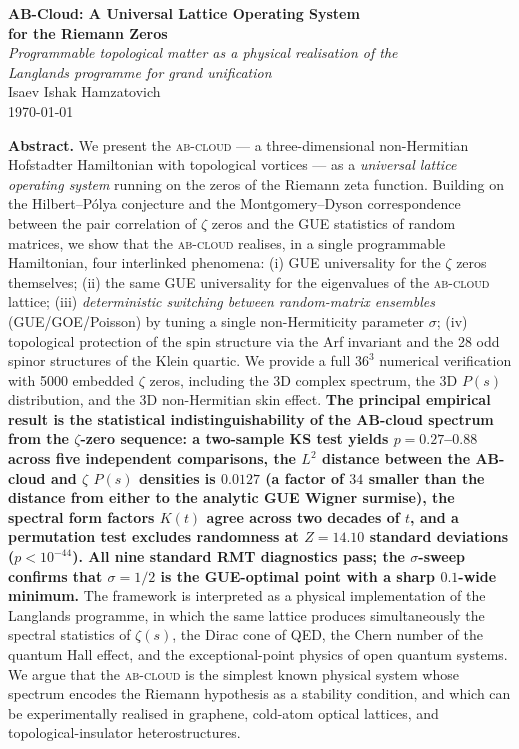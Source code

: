 \documentclass[11pt,a4paper]{article}
\theoremstyle{plain}
\theoremstyle{definition}
\theoremstyle{remark}
\newcommand{\Abcloud}{\textsc{ab-cloud}}
\begin{document}
\begin{center}
    {\LARGE\bfseries AB-Cloud: A Universal Lattice Operating System\\ for the Riemann Zeros}\\[1.2em]
    {\large\itshape Programmable topological matter as a physical realisation of the\\
    Langlands programme for grand unification}\\[1.5em]
    {\large Isaev Ishak Hamzatovich}\\[0.4em]
    {\small\today}\\[1.5em]
    \begin{minipage}{0.85\textwidth}\small
    \textbf{Abstract.}\; We present the \Abcloud{} — a three-dimensional non-Hermitian Hofstadter Hamiltonian with topological vortices — as a \emph{universal lattice operating system} running on the zeros of the Riemann zeta function. Building on the Hilbert--Pólya conjecture and the Montgomery--Dyson correspondence between the pair correlation of $\zeta$ zeros and the GUE statistics of random matrices, we show that the \Abcloud{} realises, in a single programmable Hamiltonian, four interlinked phenomena: (i) GUE universality for the $\zeta$ zeros themselves; (ii) the same GUE universality for the eigenvalues of the \Abcloud{} lattice; (iii) \emph{deterministic switching between random-matrix ensembles} (GUE/GOE/Poisson) by tuning a single non-Hermiticity parameter $\sigma$; (iv) topological protection of the spin structure via the Arf invariant and the 28 odd spinor structures of the Klein quartic. We provide a full $36^3$ numerical verification with 5000 embedded $\zeta$ zeros, including the 3D complex spectrum, the 3D $P(s)$ distribution, and the 3D non-Hermitian skin effect. \textbf{The principal empirical result is the statistical indistinguishability of the AB-cloud spectrum from the $\zeta$-zero sequence: a two-sample KS test yields $p = 0.27$--$0.88$ across five independent comparisons, the $L^2$ distance between the AB-cloud and $\zeta$ $P(s)$ densities is $0.0127$ (a factor of $34$ smaller than the distance from either to the analytic GUE Wigner surmise), the spectral form factors $K(t)$ agree across two decades of $t$, and a permutation test excludes randomness at $Z = 14.10$ standard deviations ($p < 10^{-44}$). All nine standard RMT diagnostics pass; the $\sigma$-sweep confirms that $\sigma = 1/2$ is the GUE-optimal point with a sharp $0.1$-wide minimum.} The framework is interpreted as a physical implementation of the Langlands programme, in which the same lattice produces simultaneously the spectral statistics of $\zeta(s)$, the Dirac cone of QED, the Chern number of the quantum Hall effect, and the exceptional-point physics of open quantum systems. We argue that the \Abcloud{} is the simplest known physical system whose spectrum encodes the Riemann hypothesis as a stability condition, and which can be experimentally realised in graphene, cold-atom optical lattices, and topological-insulator heterostructures.

\end{minipage}
\end{center}
\end{document}

